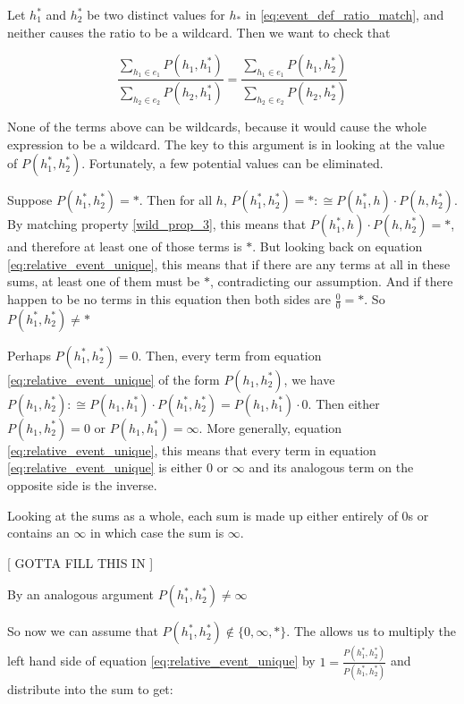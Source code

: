 \documentclass[twoside]{article}
\begin{document}
Let \(h_1^*\) and \(h_2^*\) be two distinct values for \(h_*\) in \ref{eq:event_def_ratio_match}, and neither causes the ratio to be a wildcard. Then we want to check that

\begin{equation}
\label{eq:relative_event_unique}
\frac{\sum_{h_1 \in e_1} P(h_1, h_1^*)}{\sum_{h_2 \in e_2} P(h_2, h_1^*)} = \frac{\sum_{h_1 \in e_1} P(h_1, h_2^*)}{\sum_{h_2 \in e_2} P(h_2, h_2^*)}
\end{equation}

None of the terms above can be wildcards, because it would cause the whole expression to be a wildcard. The key to this argument is in looking at the value of \(P(h_1^*, h_2^*)\). Fortunately, a few potential values can be eliminated.

Suppose \(P(h_1^*, h_2^*) = \ast\). Then for all \(h\), \(P(h_1^*, h_2^*) = \ast :\cong P(h_1^*, h) \cdot P(h, h_2^*)\). By matching property \ref{wild_prop_3}, this means that \(P(h_1^*, h) \cdot P(h, h_2^*) = \ast\), and therefore at least one of those terms is \(\ast\). But looking back on equation \ref{eq:relative_event_unique}, this means that if there are any terms at all in these sums, at least one of them must be \(\ast\), contradicting our assumption. And if there happen to be no terms in this equation then both sides are \(\frac{0}{0}=\ast\). So \(P(h_1^*, h_2^*) \neq \ast\)

Perhaps \(P(h_1^*, h_2^*) = 0\). Then, every term from equation \ref{eq:relative_event_unique} of the form \(P(h_1, h_2^*)\), we have \(P(h_1, h_2^*):\cong P(h_1, h_1^*) \cdot P(h_1^*, h_2^*) = P(h_1, h_1^*) \cdot 0\). Then either \(P(h_1, h_2^*) = 0\) or \(P(h_1, h_1^*) = \infty\). More generally, equation \ref{eq:relative_event_unique}, this means that every term in equation \ref{eq:relative_event_unique} is either \(0\) or \(\infty\) and its analogous term on the opposite side is the inverse.

Looking at the sums as a whole, each sum is made up either entirely of 0s or contains an \(\infty\) in which case the sum is \(\infty\).

[ GOTTA FILL THIS IN ]

By an analogous argument  \(P(h_1^*, h_2^*) \neq \infty\)

So now we can assume that \(P(h_1^*, h_2^*) \notin \{0, \infty, \ast\} \). The allows us to multiply the left hand side of equation \ref{eq:relative_event_unique} by \(1 = \frac{P(h_1^*, h_2^*)}{P(h_1^*, h_2^*)}\) and distribute into the sum to get:
\end{document}
